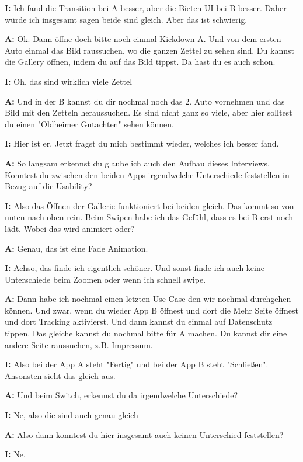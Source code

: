 \begin{myparindent}{0pt}
\textbf{I:} Ich fand die Transition bei A besser, aber die Bieten UI bei B besser. Daher würde ich insgesamt sagen beide sind gleich. Aber das ist schwierig.

\textbf{A:} Ok. Dann öffne doch bitte noch einmal Kickdown A. Und von dem ersten Auto einmal das Bild raussuchen, wo die ganzen Zettel zu sehen sind. Du kannst die Gallery öffnen, indem du auf das Bild tippst. Da hast du es auch schon.  

\textbf{I:} Oh, das sind wirklich viele Zettel 

\textbf{A:} Und in der B kannst du dir nochmal noch das 2. Auto vornehmen und das Bild mit den Zetteln  heraussuchen. Es sind nicht ganz so viele, aber hier solltest du einen "Oldheimer Gutachten" sehen können. 

\textbf{I:} Hier ist er. Jetzt fragst du mich bestimmt wieder, welches ich besser fand. 

\textbf{A:} So langsam erkennst du glaube ich auch den Aufbau dieses Interviews. Konntest du zwischen den beiden Apps irgendwelche Unterschiede feststellen in Bezug auf die Usability?

\textbf{I:} Also das Öffnen der Gallerie funktioniert bei beiden gleich. Das kommt so von unten nach oben rein. Beim Swipen habe ich das Gefühl, dass es bei  B erst noch lädt. Wobei das wird animiert oder?

\textbf{A:} Genau, das ist eine Fade Animation.

\textbf{I:} Achso, das finde ich eigentlich schöner. Und sonst finde ich auch keine Unterschiede beim Zoomen oder wenn ich schnell swipe. 

\textbf{A:} Dann habe ich nochmal einen letzten Use Case den wir nochmal durchgehen können. Und zwar, wenn du wieder App B öffnest und dort die Mehr Seite öffnest und dort Tracking aktivierst. Und dann kannst du einmal auf Datenschutz tippen. Das gleiche kannst du nochmal bitte für A machen. Du kannst dir eine andere Seite raussuchen, z.B. Impressum. 

\textbf{I:} Also bei der App A steht "Fertig" und bei der App B steht "Schließen". Ansonsten sieht das gleich aus.

\textbf{A:} Und beim Switch, erkennst du da irgendwelche Unterschiede?

\textbf{I:} Ne, also die sind auch genau gleich

\textbf{A:} Also dann konntest du hier insgesamt auch keinen Unterschied feststellen?

\textbf{I:} Ne.


\end{myparindent}
